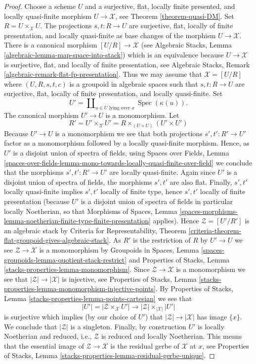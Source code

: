 \documentclass[10pt,a4paper]{amsart}
\theoremstyle{plain}
\theoremstyle{definition}
\theoremstyle{remark}
\numberwithin{equation}{subsection}
\def\Spec{\mathop{\mathrm{Spec}}}
\begin{document}
\begin{proof}
Choose a scheme $U$ and a surjective, flat, locally finite presented,
and locally quasi-finite morphism $U \to \mathcal{X}$, see
Theorem \ref{theorem-quasi-DM}.
Set $R = U \times_\mathcal{X} U$. The projections $s, t : R \to U$
are surjective, flat, locally of finite presentation, and
locally quasi-finite as base changes of the morphism $U \to \mathcal{X}$.
There is a canonical morphism $[U/R] \to \mathcal{X}$ (see
Algebraic Stacks, Lemma \ref{algebraic-lemma-map-space-into-stack})
which is an equivalence because $U \to \mathcal{X}$ is surjective, flat,
and locally of finite presentation, see
Algebraic Stacks, Remark \ref{algebraic-remark-flat-fp-presentation}.
Thus we may assume that $\mathcal{X} = [U/R]$ where
$(U, R, s, t, c)$ is a groupoid in algebraic spaces such that
$s, t : R \to U$ are surjective, flat, locally of finite presentation,
and locally quasi-finite. Set
$$
U' = \coprod\nolimits_{u \in U\text{ lying over }x} \Spec(\kappa(u)).
$$
The canonical morphism $U' \to U$ is a monomorphism. Let
$$
R' = U' \times_\mathcal{X} U' =
R \times_{(U \times U)} (U' \times U')
$$
Because $U' \to U$ is a monomorphism we see that both projections
$s', t' : R' \to U'$ factor as a monomorphism followed by a locally
quasi-finite morphism. Hence, as $U'$ is a disjoint union of spectra
of fields, using
Spaces over Fields, Lemma
\ref{spaces-over-fields-lemma-mono-towards-locally-quasi-finite-over-field}
we conclude that the morphisms $s', t' : R' \to U'$ are locally quasi-finite.
Again since $U'$ is a disjoint union of spectra of fields, the morphisms
$s', t'$ are also flat. Finally, $s', t'$ locally quasi-finite
implies $s', t'$ locally of finite type, hence $s', t'$ locally of finite
presentation (because $U'$ is a disjoint union of spectra of fields
in particular locally Noetherian, so that
Morphisms of Spaces, Lemma
\ref{spaces-morphisms-lemma-noetherian-finite-type-finite-presentation}
applies). Hence $\mathcal{Z} = [U'/R']$ is an algebraic stack by
Criteria for Representability, Theorem
\ref{criteria-theorem-flat-groupoid-gives-algebraic-stack}.
As $R'$ is the restriction of $R$ by $U' \to U$ we see
$\mathcal{Z} \to \mathcal{X}$ is a monomorphism by
Groupoids in Spaces, Lemma
\ref{spaces-groupoids-lemma-quotient-stack-restrict}
and
Properties of Stacks, Lemma \ref{stacks-properties-lemma-monomorphism}.
Since $\mathcal{Z} \to \mathcal{X}$ is a monomorphism we see that
$|\mathcal{Z}| \to |\mathcal{X}|$ is injective, see
Properties of Stacks, Lemma
\ref{stacks-properties-lemma-monomorphism-injective-points}.
By
Properties of Stacks, Lemma \ref{stacks-properties-lemma-points-cartesian}
we see that
$$
|U'| = |\mathcal{Z} \times_\mathcal{X} U'|
\longrightarrow
|\mathcal{Z}| \times_{|\mathcal{X}|} |U'|
$$
is surjective which implies (by our choice of $U'$) that
$|\mathcal{Z}| \to |\mathcal{X}|$ has image $\{x\}$.
We conclude that $|\mathcal{Z}|$ is a singleton.
Finally, by construction $U'$ is locally Noetherian and reduced, i.e.,
$\mathcal{Z}$ is reduced and locally Noetherian. This means that
the essential image of $\mathcal{Z} \to \mathcal{X}$
is the residual gerbe of $\mathcal{X}$ at $x$, see
Properties of Stacks, Lemma
\ref{stacks-properties-lemma-residual-gerbe-unique}.
\end{proof}
\end{document}
